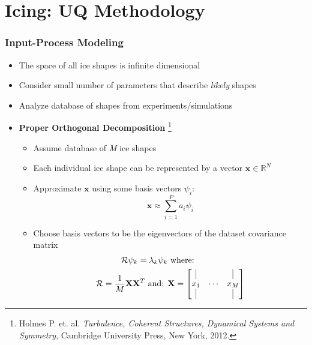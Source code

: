 \documentclass[9pt]{beamer}
\newcommand{\bv}[1]{\mathbf{#1}}
\begin{document}
\section{Icing: UQ Methodology}
\label{sec-2}
\begin{frame}
\frametitle{Input-Process Modeling}
\label{sec-2-1}


\begin{itemize}
\item The space of all ice shapes is infinite dimensional
\item Consider small number of parameters that describe \emph{likely} shapes
\item Analyze database of shapes from experiments/simulations
\item \textbf{Proper Orthogonal Decomposition} \footnote{Holmes P. et. al. \emph{Turbulence, Coherent Structures, Dynamical Systems and Symmetry}, Cambridge University Press, New York, 2012.
 }
\begin{itemize}
\item Assume database of \emph{M} ice shapes
\item Each individual ice shape can be represented by a vector $\bv{x}
    \in \mathbb{R}^N$
\item Approximate $\bv{x}$ using some basis vectors $\psi_i$:
    \begin{equation*}
      \bv{x} \approx \sum_{i=1}^P a_i \psi_i
    \end{equation*}
\item Choose basis vectors to be the eigenvectors of the dataset
    covariance matrix
    \begin{equation*}
    \begin{aligned}
      \mathcal{R} \psi_k = \lambda_k \psi_k& \text{   where:   } \\ 
      \mathcal{R} = \frac{1}{M}\mathbf{X}\mathbf{X}^T \text{   and:   }&
      \mathbf{X} =
       \begin{bmatrix}
        \vline & & \vline \\
        x_1 & \cdots & x_M \\
        \vline & & \vline \\
       \end{bmatrix}
    \end{aligned}
    \end{equation*}
\end{itemize}
\end{itemize}
\end{frame}
\end{document}
